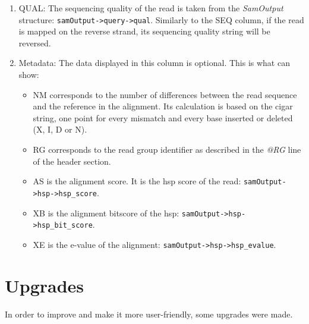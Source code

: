 \begin{enumerate}
    \item QUAL: The sequencing quality of the read is taken from the \emph{SamOutput} structure: \texttt{samOutput->\allowbreak query->\allowbreak qual}.
    Similarly to the SEQ column, if the read is mapped on the reverse strand, its sequencing quality string will be reversed.
    \item Metadata: The data displayed in this column is optional. This is what \blastobam{} can show:
    \begin{itemize}
        \item NM corresponds to the number of differences between the read sequence and the reference in the alignment.
        Its calculation is based on the \gls{cigar} string, one point for every mismatch and every base inserted or deleted (X, I, D or N).
        \item RG corresponds to the read group identifier as described in the \emph{@RG} line of the header section.
        \item AS is the alignment score. It is the \gls{hsp} score of the read: \texttt{samOutput->\allowbreak hsp->\allowbreak hsp\_score}.
        \item XB is the alignment bitscore of the \gls{hsp}: \texttt{samOutput->\allowbreak hsp->\allowbreak hsp\_bit\_score}.
        \item XE is the e-value of the alignment: \texttt{samOutput->\allowbreak hsp->\allowbreak hsp\_evalue}.
    \end{itemize}
\end{enumerate}


\section{Upgrades}
In order to improve \blastobam{} and make it more user-friendly, some upgrades were made.


